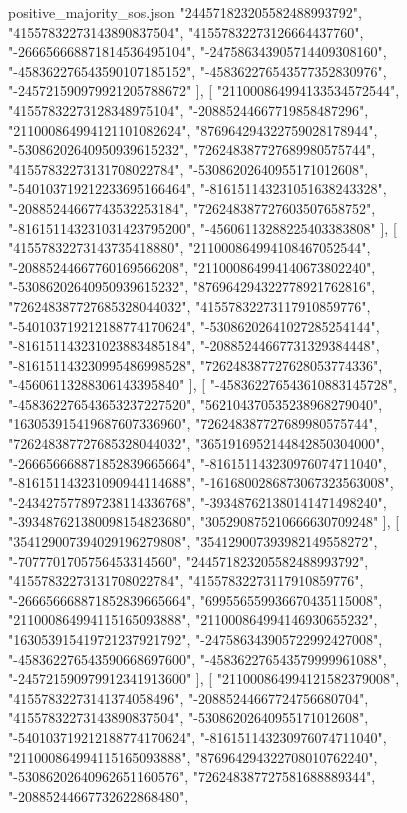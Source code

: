 \begin{filecontents*}[overwrite]{positive_majority_sos.json}
    "244571823205582488993792",
    "41557832273143890837504",
    "41557832273126664437760",
    "-266656668871814536495104",
    "-247586343905714409308160",
    "-458362276543590107185152",
    "-458362276543577352830976",
    "-245721590979921205788672"
   ],
   [
    "211000864994133534572544",
    "41557832273128348975104",
    "-20885244667719858487296",
    "211000864994121101082624",
    "876964294322759028178944",
    "-53086202640950939615232",
    "726248387727689980575744",
    "41557832273131708022784",
    "-53086202640955171012608",
    "-540103719212233695166464",
    "-816151143231051638243328",
    "-20885244667743532253184",
    "726248387727603507658752",
    "-816151143231031423795200",
    "-45606113288225403383808"
   ],
   [
    "41557832273143735418880",
    "211000864994108467052544",
    "-20885244667760169566208",
    "211000864994140673802240",
    "-53086202640950939615232",
    "876964294322778921762816",
    "726248387727685328044032",
    "41557832273117910859776",
    "-540103719212188774170624",
    "-53086202641027285254144",
    "-816151143231023883485184",
    "-20885244667731329384448",
    "-816151143230995486998528",
    "726248387727628053774336",
    "-45606113288306143395840"
   ],
   [
    "-458362276543610883145728",
    "-458362276543653237227520",
    "562104370535238968279040",
    "163053915419687607336960",
    "726248387727689980575744",
    "726248387727685328044032",
    "3651916952144842850304000",
    "-266656668871852839665664",
    "-816151143230976074711040",
    "-816151143231090944114688",
    "-1616800286873067323563008",
    "-243427577897238114336768",
    "-393487621380141471498240",
    "-393487621380098154823680",
    "305290875210666630709248"
   ],
   [
    "354129007394029196279808",
    "354129007393982149558272",
    "-7077701705756453314560",
    "244571823205582488993792",
    "41557832273131708022784",
    "41557832273117910859776",
    "-266656668871852839665664",
    "699556559936670435115008",
    "211000864994115165093888",
    "211000864994146930655232",
    "163053915419721237921792",
    "-247586343905722992427008",
    "-458362276543590668697600",
    "-458362276543579999961088",
    "-245721590979912341913600"
   ],
   [
    "211000864994121582379008",
    "41557832273141374058496",
    "-20885244667724756680704",
    "41557832273143890837504",
    "-53086202640955171012608",
    "-540103719212188774170624",
    "-816151143230976074711040",
    "211000864994115165093888",
    "876964294322708010762240",
    "-53086202640962651160576",
    "726248387727581688889344",
    "-20885244667732622868480",

\end{filecontents*}
